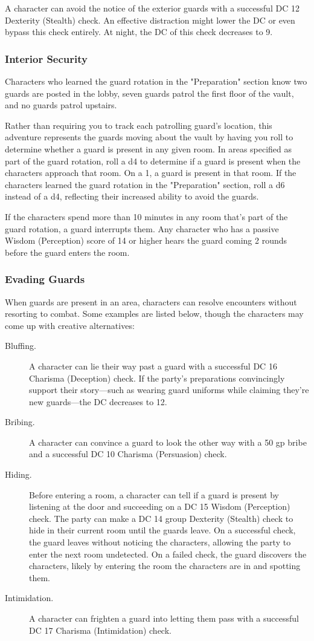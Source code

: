 \documentclass[10pt,a4paper,twoside,bg=print,twocolumn,openany,nodeprecatedcode]{dndbook}
\begin{document}
A character can avoid the notice of the exterior guards with a successful DC 12 Dexterity (Stealth) check. An effective distraction might lower the DC or even bypass this check entirely. At night, the DC of this check decreases to 9.

\subsubsection{Interior Security}
Characters who learned the guard rotation in the "Preparation" section know two guards are posted in the lobby, seven guards patrol the first floor of the vault, and no guards patrol upstairs.

Rather than requiring you to track each patrolling guard's location, this adventure represents the guards moving about the vault by having you roll to determine whether a guard is present in any given room. In areas specified as part of the guard rotation, roll a d4 to determine if a guard is present when the characters approach that room. On a 1, a guard is present in that room. If the characters learned the guard rotation in the "Preparation" section, roll a d6 instead of a d4, reflecting their increased ability to avoid the guards.

If the characters spend more than 10 minutes in any room that's part of the guard rotation, a guard interrupts them. Any character who has a passive Wisdom (Perception) score of 14 or higher hears the guard coming 2 rounds before the guard enters the room.

\subsubsection{Evading Guards}
When guards are present in an area, characters can resolve encounters without resorting to combat. Some examples are listed below, though the characters may come up with creative alternatives:


\begin{description}
\item[Bluffing.]
A character can lie their way past a guard with a successful DC 16 Charisma (Deception) check. If the party's preparations convincingly support their story—such as wearing guard uniforms while claiming they're new guards—the DC decreases to 12.
\item[Bribing.]
A character can convince a guard to look the other way with a 50 gp bribe and a successful DC 10 Charisma (Persuasion) check.
\item[Hiding.]
Before entering a room, a character can tell if a guard is present by listening at the door and succeeding on a DC 15 Wisdom (Perception) check. The party can make a DC 14 group Dexterity (Stealth) check to hide in their current room until the guards leave. On a successful check, the guard leaves without noticing the characters, allowing the party to enter the next room undetected. On a failed check, the guard discovers the characters, likely by entering the room the characters are in and spotting them.
\item[Intimidation.]
A character can frighten a guard into letting them pass with a successful DC 17 Charisma (Intimidation) check.
\end{description}
\end{document}
